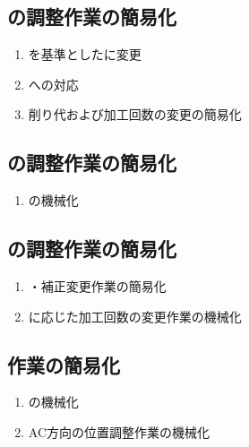 \subsection{\EndFacecutMilling の調整作業の簡易化}
\begin{enumerate}[label=\sarrow]
\item \IDCenter を基準とした\EndFacecutMilling に変更
\item \ODCornerR への対応
\item {}削り代および加工回数の変更の簡易化
\end{enumerate}


\subsection{\OutcutMilling の調整作業の簡易化}
\begin{enumerate}[label=\sarrow]
\item \CurvedOutcutMilling の機械化
\end{enumerate}


\subsection{\KeywayMilling の調整作業の簡易化}
\begin{enumerate}[label=\sarrow]
\item \KeywayPos・\KeywayWidth 補正変更作業の簡易化
\item \KeywayWidth に応じた加工回数の変更作業の機械化
\end{enumerate}


\subsection{\EndFaceChamferMilling 作業の簡易化}
\begin{enumerate}[label=\sarrow]
\item \EndFaceChamferMilling の機械化
\item AC方向の位置調整作業の機械化
\end{enumerate}



